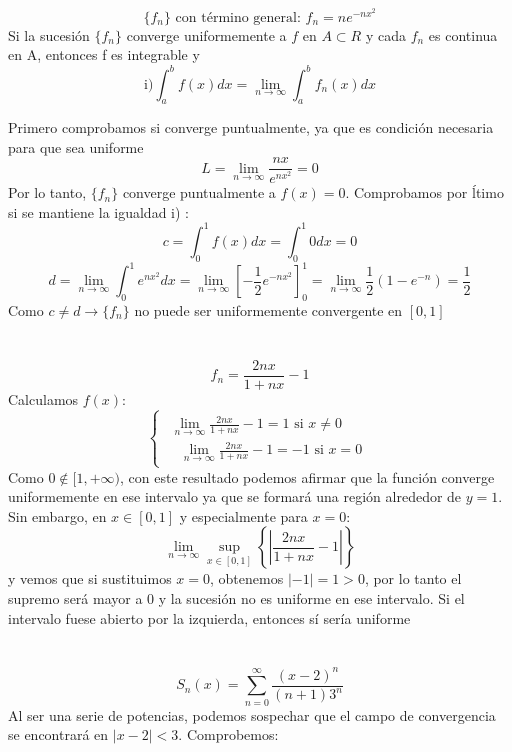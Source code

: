 \documentclass[12pt,a4paper,oneside,onecolumn]{article}
\begin{document}
 
    \section{}
    \[
        \{f_n\} \text{ con t\'ermino general:  } f_n = ne^{-nx^2} 
    \]
    Si la sucesi\'on $\{f_n\}$ converge uniformemente a $f $ en $A\subset R$ y cada $f_n$ es continua en A, entonces f es integrable y 
    \[
        \text{i)}\int_{a}^{b}{f(x) dx} = \lim_{n\to\infty}{ \int_{a}^{b}{f_n(x) dx}}
    \]
    
    Primero comprobamos si converge puntualmente, ya que es condici\'on necesaria para que sea uniforme
    \[
        L = \lim_{n\to\infty}\frac{nx}{e^{nx^2}} = 0
    \]
    Por lo tanto, $\{f_n\}$ converge puntualmente a  $f(x) = 0$.
    Comprobamos por \'ltimo si se mantiene la igualdad i) :
    \[
        c = \int_{0}^{1}{f(x) dx} = \int_{0}^{1}{0 dx} = 0
    \]
    \[
        d = \lim_{n\to\infty}\int_{0}^{1}{e^{nx^2} dx} = \lim_{n\to\infty}[-\frac{1}{2}e^{-nx^2}]^1_0 = \lim_{n\to\infty}\frac{1}{2}(1-e^{-n}) = \frac{1}{2}
    \]
    Como $c\ne d \rightarrow \{f_n\}$ no puede ser uniformemente convergente en $[0, 1]$
    
    \section{}
    \[
        f_n = \frac{2nx}{1+nx}-1
    \]
    Calculamos $f(x)$:
    \[
        \begin{cases}
        \begin{aligned}
            \lim_{n\to\infty}\frac{2nx}{1+nx}-1 = 1 \text{  si  } x\ne 0 \\
            \text{ }\lim_{n\to\infty}\frac{2nx}{1+nx}-1 = -1 \text{  si  } x=0
        \end{aligned}
        \end{cases}
    \]
    Como $0\notin [1,+\infty)$, con este resultado podemos afirmar que la funci\'on converge uniformemente en ese intervalo ya que se formar\'a una regi\'on alrededor de $y=1$.
    Sin embargo, en $x\in[0, 1]$ y especialmente para $x=0$:
    \[
        \lim_{n\to\infty}\sup_{x \in [0,1]}\left\{\left|\frac{2nx}{1+nx}-1\right|\right\} 
    \]
    y vemos que si sustituimos $x=0$, obtenemos $|-1| = 1 > 0$, por lo tanto el supremo ser\'a mayor a 0 y la sucesi\'on no es uniforme en ese intervalo. Si el intervalo fuese abierto por la izquierda, entonces s\'i ser\'ia uniforme
    
    \section{}
    \[
    S_n(x) = \sum_{n=0}^{\infty}{\frac{(x-2)^n}{(n+1)3^n}}
    \]
    Al ser una serie de potencias, podemos sospechar que el campo de convergencia se encontrará en $|x-2|<3$. Comprobemos:
    
\end{document}
